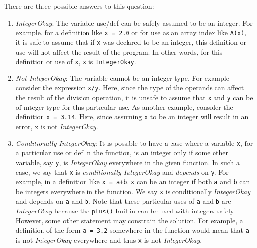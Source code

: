 There are three possible answers to this question: 
\begin{enumerate}

\item \emph{IntegerOkay}: The variable use/def can be safely assumed to be an
integer.  For example, for a definition like \texttt{x = 2.0} or for use
as an array index like \texttt{A(x)}, it is safe to assume that if
\verb|x| was declared to be an integer, this definition or use will not
affect the result of the program. In other words, for this definition or
use of \verb|x|, \verb|x| is \texttt{IntegerOkay}.

\item \emph{Not IntegerOkay}: The variable cannot be an integer type.
For example consider the expression \texttt{x/y}. Here, since the type
of the operands can affect the result of the division operation, it is
unsafe to assume that \verb|x| and \verb|y| can be of integer type for
this particular use. As another example, consider the definition
\texttt{x = 3.14}. Here, since assuming \verb|x| to be an integer will
result in an error, x is not \emph{IntegerOkay}. 

\item \emph{Conditionally IntegerOkay}: It is possible to have a case where a
variable \verb|x|, for a particular use or def in the function, is an integer
only if some other variable, say \verb|y|, is \emph{IntegerOkay} everywhere
in the given function. In such a case, we say that \verb|x| is
\emph{conditionally IntegerOkay} and \emph{depends} on \verb|y|. 
For example, in a definition like \texttt{x = a+b}, \verb|x| can be an integer
if both \verb|a| and \verb|b| can be integers everywhere in the function. We
say \verb|x| is conditionally \emph{IntegerOkay} and depends on \verb|a| and
\verb|b|. 
Note that these particular uses of \verb|a| and \verb|b| are
\emph{IntegerOkay} because the \texttt{plus()} builtin can be used with
integers safely. However, some other statement may constrain the solution. For
example, a definition of the form \texttt{a = 3.2} somewhere in the function
would mean that \verb|a| is not \emph{IntegerOkay} everywhere and thus
\verb|x| is not \emph{IntegerOkay}.
\end{enumerate}   

